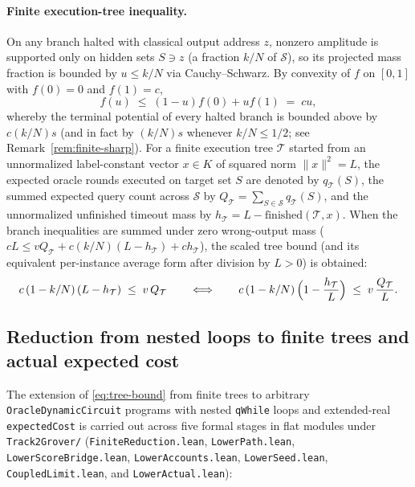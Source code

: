 \documentclass[11pt,a4paper]{article}
\theoremstyle{definition}
\theoremstyle{remark}
\begin{document}
\paragraph{Finite execution-tree inequality.}
On any branch halted with classical output address \(z\), nonzero amplitude is supported only on hidden sets \(S \ni z\) (a fraction \(k/N\) of \(\mathcal{S}\)), so its projected mass fraction is bounded by \(u \le k/N\) via Cauchy--Schwarz. By convexity of \(f\) on \([0, 1]\) with \(f(0) = 0\) and \(f(1) = c\),
\[
  f(u) \;\le\; (1 - u)f(0) + u f(1) \;=\; c u,
\]
whereby the terminal potential of every halted branch is bounded above by \(c(k/N)s\) (and in fact by \((k/N)s\) whenever \(k/N \le 1/2\); see Remark~\ref{rem:finite-sharp}). For a finite execution tree \(\mathcal{T}\) started from an unnormalized label-constant vector \(x \in K\) of squared norm \(\|x\|^2 = L\), the expected oracle rounds executed on target set \(S\) are denoted by \(q_{\mathcal{T}}(S)\), the summed expected query count across \(\mathcal{S}\) by \(Q_{\mathcal{T}} = \sum_{S \in \mathcal{S}} q_{\mathcal{T}}(S)\), and the unnormalized unfinished timeout mass by \(h_{\mathcal{T}} = L - \mathrm{finished}(\mathcal{T}, x)\). When the branch inequalities are summed under zero wrong-output mass (\(c L \le v Q_{\mathcal{T}} + c(k/N)(L - h_{\mathcal{T}}) + c h_{\mathcal{T}}\)), the scaled tree bound (and its equivalent per-instance average form after division by \(L > 0\)) is obtained:
\begin{equation}
  c\,(1 - k/N)\,(L - h_{\mathcal{T}}) \;\le\; v\,Q_{\mathcal{T}}
  \qquad\Longleftrightarrow\qquad
  c\,(1 - k/N)\,\Bigl(1 - \frac{h_{\mathcal{T}}}{L}\Bigr) \;\le\; v\,\frac{Q_{\mathcal{T}}}{L}.
  \label{eq:tree-bound}
\end{equation}

\subsection{Reduction from nested loops to finite trees and actual expected cost}
\label{sec:findany-loops}

The extension of \eqref{eq:tree-bound} from finite trees to arbitrary \texttt{OracleDynamic\allowbreak Circuit} programs with nested \texttt{qWhile} loops and extended-real \texttt{expectedCost} is carried out across five formal stages in flat modules under \texttt{Track2Grover/} (\texttt{Finite\allowbreak Reduction.lean}, \texttt{Lower\allowbreak Path.lean}, \texttt{Lower\allowbreak Score\allowbreak Bridge.lean}, \texttt{Lower\allowbreak Accounts.lean}, \texttt{Lower\allowbreak Seed.lean}, \texttt{Coupled\allowbreak Limit.lean}, and \texttt{Lower\allowbreak Actual.lean}):
\end{document}

